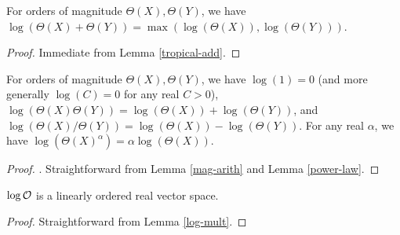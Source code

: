 \begin{lemma}\label{log-add}  For orders of magnitude $\Theta(X), \Theta(Y)$, we have $\log(\Theta(X) + \Theta(Y)) = \max(\log(\Theta(X)), \log(\Theta(Y)))$.
\end{lemma}

\begin{proof} Immediate from Lemma \ref{tropical-add}.
\end{proof}

\begin{lemma}\label{log-mult}  For orders of magnitude $\Theta(X), \Theta(Y)$, we have $\log(1) = 0$ (and more generally $\log(C) = 0$ for any real $C>0$), $\log(\Theta(X) \Theta(Y)) = \log(\Theta(X)) + \log(\Theta(Y))$, and $\log(\Theta(X) / \Theta(Y)) = \log(\Theta(X)) - \log(\Theta(Y))$.  For any real $\alpha$, we have $\log(\Theta(X)^\alpha) = \alpha \log(\Theta(X))$.
\end{lemma}

\begin{proof}. Straightforward from Lemma \ref{mag-arith} and Lemma \ref{power-law}.
\end{proof}

\begin{lemma}\label{ord-vec} $\log {\mathcal O}$ is a linearly ordered real vector space.
\end{lemma}

\begin{proof} Straightforward from Lemma \ref{log-mult}.
\end{proof}
